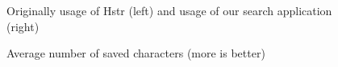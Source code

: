 \begin{figure}
\centering
{}\hfill
{}
\caption{Average number of saved characters (more is better)}
\small{Originally usage of Hstr (left) and usage of our search application (right)}
\label{eval-metrics-plot-dist-0-chars}
\end{figure}


